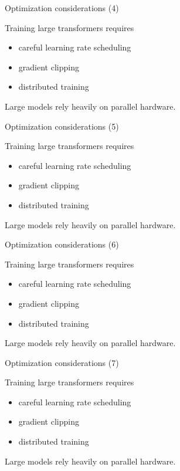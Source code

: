 \documentclass[aspectratio=169]{beamer}
\begin{document}
\begin{frame}{Optimization considerations (4)}

Training large transformers requires

\begin{itemize}
\item careful learning rate scheduling
\item gradient clipping
\item distributed training
\end{itemize}

Large models rely heavily on parallel hardware.

\end{frame}


\begin{frame}{Optimization considerations (5)}

Training large transformers requires

\begin{itemize}
\item careful learning rate scheduling
\item gradient clipping
\item distributed training
\end{itemize}

Large models rely heavily on parallel hardware.

\end{frame}


\begin{frame}{Optimization considerations (6)}

Training large transformers requires

\begin{itemize}
\item careful learning rate scheduling
\item gradient clipping
\item distributed training
\end{itemize}

Large models rely heavily on parallel hardware.

\end{frame}


\begin{frame}{Optimization considerations (7)}

Training large transformers requires

\begin{itemize}
\item careful learning rate scheduling
\item gradient clipping
\item distributed training
\end{itemize}

Large models rely heavily on parallel hardware.

\end{frame}
\end{document}
